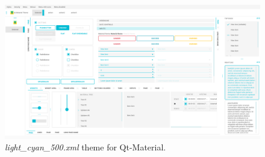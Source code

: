 \begin{figure}
\begin{centering}
% 
\includegraphics[width=1\textwidth]{Appendix/python_modules/Figures/qt-light_cyan_500.png}
\par\end{centering}
\caption[\textit{light\_cyan\_500.xml} theme for Qt-Material]{\textit{light\_cyan\_500.xml} theme for Qt-Material.}
\label{fig:qt-light_cyan_500}
\end{figure}